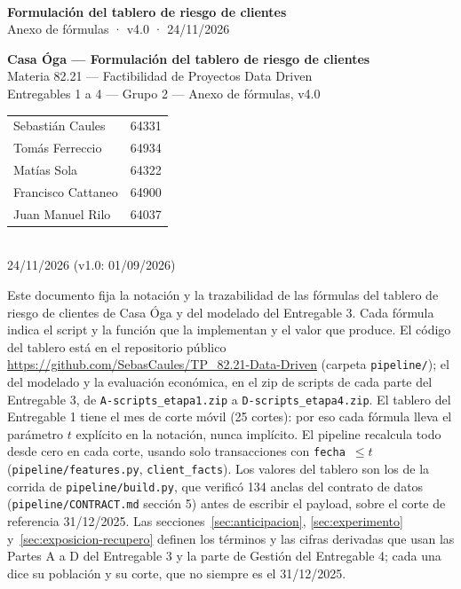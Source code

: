 \documentclass[11pt,a4paper]{article}
\title{}
\date{}
\begin{document}

\ifdefined\consolidado
\pagestyle{empty}
\setcounter{page}{\consolidado}
\renewcommand{\contentsname}{Contenido del anexo}
\setcounter{tocdepth}{1}  %
\\[1mm]
{\Large\bfseries Formulación del tablero de riesgo de clientes}\\[1mm]
{\small\color[HTML]{8A8680} Anexo de fórmulas · v4.0 · 24/11/2026}
\else
\begin{center}
{\LARGE \textbf{Casa Óga --- Formulación del tablero de riesgo de clientes}}\\[4mm]
Materia 82.21 --- Factibilidad de Proyectos Data Driven\\
Entregables 1 a 4 --- Grupo 2 --- Anexo de fórmulas, v4.0\\[3mm]
\begin{tabular}{ll}
Sebastián Caules & 64331 \\
Tomás Ferreccio & 64934 \\
Matías Sola & 64322 \\
Francisco Cattaneo & 64900 \\
Juan Manuel Rilo & 64037 \\
\end{tabular}\\[3mm]
24/11/2026 (v1.0: 01/09/2026)
\end{center}
\fi

\vspace{4mm}
\noindent Este documento fija la notación y la trazabilidad de las fórmulas del tablero de riesgo de clientes de Casa Óga y del modelado del Entregable 3. Cada fórmula indica el script y la función que la implementan y el valor que produce. El código del tablero está en el repositorio público \url{https://github.com/SebasCaules/TP_82.21-Data-Driven} (carpeta \texttt{pipeline/}); el del modelado y la evaluación económica, en el zip de scripts de cada parte del Entregable 3, de \texttt{A-scripts\_etapa1.zip} a \texttt{D-scripts\_etapa4.zip}. El tablero del Entregable 1 tiene el mes de corte móvil (25 cortes): por eso cada fórmula lleva el parámetro $t$ explícito en la notación, nunca implícito. El pipeline recalcula todo desde cero en cada corte, usando solo transacciones con \texttt{fecha}~$\le t$ (\texttt{pipeline/features.py}, \texttt{client\_facts}). Los valores del tablero son los de la corrida de \texttt{pipeline/build.py}, que verificó 134 anclas del contrato de datos (\texttt{pipeline/CONTRACT.md} sección 5) antes de escribir el payload, sobre el corte de referencia 31/12/2025. Las secciones~\ref{sec:anticipacion}, \ref{sec:experimento} y~\ref{sec:exposicion-recupero} definen los términos y las cifras derivadas que usan las Partes A a D del Entregable 3 y la parte de Gestión del Entregable 4; cada una dice su población y su corte, que no siempre es el 31/12/2025.
\end{document}
